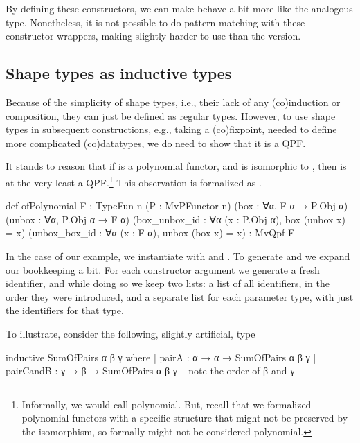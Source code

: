 By defining these constructors, we can make  behave a bit more like the analogous \inductive{}
type.
Nonetheless, it is not possible to do pattern matching with these constructor wrappers, 
making  slightly harder to use than the \inductive{} version.

\subsection*{Shape types as inductive types}
Because of the simplicity of shape types, i.e., their lack of any (co)induction or composition, 
they can just be defined as regular \inductive{} types.
However, to use shape types in subsequent constructions, e.g., taking a (co)fixpoint, 
needed to 
define more complicated (co)datatypes, we do need to show
that it is a QPF.\@

It stands to reason that if  is a polynomial functor, and  is isomorphic to , then  is at
the very least a QPF.\footnote{Informally, we would call  polynomial. But, recall that we formalized polynomial functors with a specific structure that might not be preserved by the isomorphism, so formally  might not be considered polynomial.}
This observation is formalized as .

\begin{leancode}
    def ofPolynomial {F : TypeFun n} 
                     (P : MvPFunctor n) 
                     (box    : ∀{α}, F α → P.Obj α) 
                     (unbox  : ∀{α}, P.Obj α → F α) 
                     (box_unbox_id : ∀{α} (x : P.Obj α), box (unbox x) = x)
                     (unbox_box_id : ∀{α} (x : F α), unbox (box x) = x)
                  : MvQpf F
\end{leancode}

In the case of our  example, we instantiate  with 
 and .
To generate  and  we expand our bookkeeping a bit. For each constructor argument
we generate a fresh identifier, and while doing so we keep two lists: a list of all identifiers, in 
the order they were introduced, and a separate list for each parameter type, with just the identifiers for that type.

To illustrate, consider the following, slightly artificial, type
\begin{leancode}
  inductive SumOfPairs α β γ where
    | pairA     : α → α → SumOfPairs α β γ 
    | pairCandB : γ → β → SumOfPairs α β γ   -- note the order of β and γ
\end{leancode}

